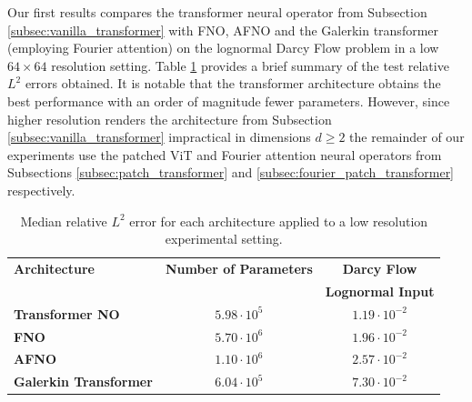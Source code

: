 \documentclass[twoside]{article}
\newcommand{\1}{\mathbbm{1}}
\begin{document}
Our first results compares the transformer neural operator from Subsection \ref{subsec:vanilla_transformer}
with FNO, AFNO and the Galerkin transformer (employing Fourier attention) on the lognormal Darcy Flow problem in a low $64\times 64$ resolution setting. Table \ref{tab:2d_median_errors_low} provides a brief summary of the test relative $L^2$ errors obtained. 
It is notable that the transformer architecture obtains the best performance with an order of magnitude fewer parameters. However, since higher resolution
renders the architecture from Subsection \ref{subsec:vanilla_transformer} impractical in dimensions
$d \ge 2$ the remainder of our experiments use the patched ViT and Fourier attention neural operators from 
Subsections \ref{subsec:patch_transformer} and  \ref{subsec:fourier_patch_transformer} respectively.




\begin{table}[htbp]
    \centering
    \begin{tabular}{|l|c|c|}
        \hline
        \cellcolor{gray!30}\textbf{Architecture} & \cellcolor{gray!30}\textbf{Number of Parameters}&\cellcolor{gray!30}\textbf{Darcy Flow}  \\
        \rowcolor{gray!30} \textbf{} &  &
        \textbf{Lognormal Input} \\
        \hhline{|===|}
        \textbf{Transformer NO} & $5.98 \cdot 10^5$ & $1.19\cdot 10^{-2}$\\
        \hline
        \textbf{FNO}& $5.70\cdot 10^6$ &$1.96\cdot 10^{-2}$\\
        \hline
        \textbf{AFNO}& $1.10\cdot 10^6$ &$2.57\cdot 10^{-2}$\\
        \hline
        \textbf{Galerkin Transformer}& $6.04\cdot 10^5$ &$7.30\cdot 10^{-2}$\\
        \hline
    \end{tabular}
    \caption{Median relative $L^2$ error for each architecture applied to a low resolution experimental setting.}
    \label{tab:2d_median_errors_low}
\end{table}
\end{document}
